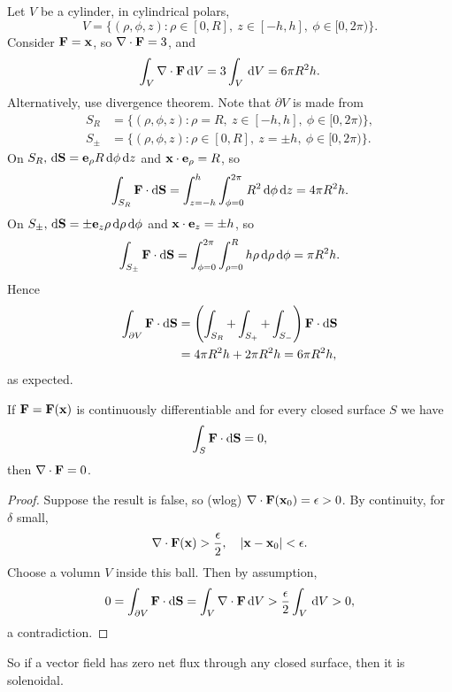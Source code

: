 \begin{example}
    Let $V$ be a cylinder, in cylindrical polars, 
    \[
        V = \{(\rho,\phi,z): \rho\in [0,R],\ z\in [-h,h],\ \phi\in [0,2\pi)\}.
    \]
    Consider $ {\bf F} = {\bf x} $, so $ \nabla\cdot{\bf F} = 3 $, and 
    \[
        \int_{V} \nabla\cdot{\bf F} \,\mathrm{d}V = 3 \int_{V} \,\mathrm{d}V = 6 \pi R^2 h.
    \]
    Alternatively, use divergence theorem. Note that $ \partial V $ is made from 
    \begin{align*}
        S_R &= \{(\rho,\phi,z): \rho=R,\ z\in [-h,h],\ \phi\in [0,2\pi)\},\\ 
        S_{\pm} &= \{(\rho,\phi,z): \rho\in [0,R],\ z=\pm h,\ \phi\in [0,2\pi)\}.
    \end{align*}
    On $ S_R, \,\mathrm{d} {\bf S} = \mathbf{e}_\rho R \,\mathrm{d} \phi\,\mathrm{d} z $ and $ {\bf x} \cdot \mathbf{e}_\rho=R $, so
    \[
        \int_{S_R} {\bf F} \cdot\mathrm{d}\mathbf{S} = \int_{z=-h}^{h} \int_{\phi=0}^{2\pi} R^2 \,\mathrm{d}\phi \,\mathrm{d}z = 4\pi R^2 h.
    \]
    On $ S_{\pm}, \,\mathrm{d} {\bf S} = \pm {\bf e}_z \rho\,\mathrm{d} \rho\,\mathrm{d} \phi $ and $ {\bf x} \cdot {\bf e}_z = \pm h $, so 
    \[ 
        \int_{S_\pm} {\bf F} \cdot\mathrm{d}\mathbf{S} = \int_{\phi=0}^{2\pi} \int_{\rho=0}^{R} h\rho \,\mathrm{d}\rho \,\mathrm{d}\phi = \pi R^2 h.
    \]
    Hence 
    \begin{align*} 
        \int_{\partial V} {\bf F} \cdot\mathrm{d}\mathbf{S} &= \left( \int_{S_R}+\int_{S_+}+\int_{S_-} \right) {\bf F}\cdot\mathrm{d}{\bf S}\\ 
        &= 4\pi R^2 h+ 2 \pi R^2 h = 6\pi R^2 h,
    \end{align*}
    as expected.
\end{example}

\begin{proposition}
    If $ {\bf F} = {\bf F}({\bf x}) $ is continuously differentiable and for every closed surface $S$ we have 
    \[
        \int_{S}  {\bf F}\cdot \mathrm{d}{\bf S} = 0,
    \]
    then $ \nabla\cdot{\bf F}= 0 $.
\end{proposition}
\begin{proof}
    Suppose the result is false, so (wlog) $ \nabla\cdot{\bf F}({\bf x}_0)=\epsilon>0 $. By continuity, for $ \delta $ small, 
    \[
        \nabla\cdot{\bf F}({\bf x})>\frac{\epsilon}{2}, \quad |{\bf x}-{\bf x}_0|<\epsilon.
    \]
    Choose a volumn $V$ inside this ball. Then by assumption,
    \[
        0 = \int_{\partial V} {\bf F} \cdot\mathrm{d}\mathbf{S} = \int_{V} \nabla\cdot{\bf F} \,\mathrm{d}V > \frac{\epsilon}{2} \int_{V} \,\mathrm{d}V>0,
    \]
    a contradiction.
\end{proof}
So if a vector field has zero net flux through any closed surface, then it is solenoidal.

